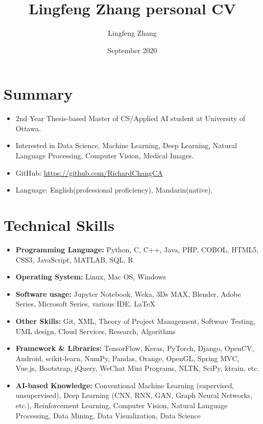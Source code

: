 \documentclass{article}
\title{Lingfeng Zhang personal CV}
\author{Lingfeng Zhang}
\date{September 2020}
\begin{document}

\makecvtitle %

\section{Summary}
\begin{itemize}
\item 2nd Year Thesis-based Master of CS/Applied AI student at University of Ottawa.
\item Interested in Data Science, Machine Learning, Deep Learning, Natural Language Processing, Computer Vision, Medical Images.
\item GitHub: \href{https://github.com/RichardChangCA}{https://github.com/RichardChangCA}
\item Language: English(professional proficiency), Mandarin(native).
\end{itemize}
 
\section{Technical Skills}

\begin{itemize}
\item \textbf{Programming Language:} Python, C, C++, Java, PHP, COBOL, HTML5, CSS3, JavaScript, MATLAB, SQL, R
\item \textbf{Operating System:} Linux, Mac OS, Windows
\item \textbf{Software usage:} Jupyter Notebook, Weka, 3Ds MAX, Blender, Adobe Series, Microsoft Series, various IDE, LaTeX
\item \textbf{Other Skills:} Git, XML, Theory of Project Management, Software Testing, UML design, Cloud Services, Research, Algorithms
\item \textbf{Framework \& Libraries:} TensorFlow, Keras, PyTorch, Django, OpenCV, Android, scikit-learn, NumPy, Pandas, Orange, OpenGL, Spring MVC, Vue.js, Bootstrap, jQuery, WeChat Mini Programs, NLTK, SciPy, ktrain, etc.
\item \textbf{AI-based Knowledge:} Conventional Machine Learning (supervised, unsupervised), Deep Learning (CNN, RNN, GAN, Graph Neural Networks, etc.), Reinforcement Learning, Computer Vision, Natural Language Processing, Data Mining, Data Visualization, Data Science
\end{itemize}
\end{document}
